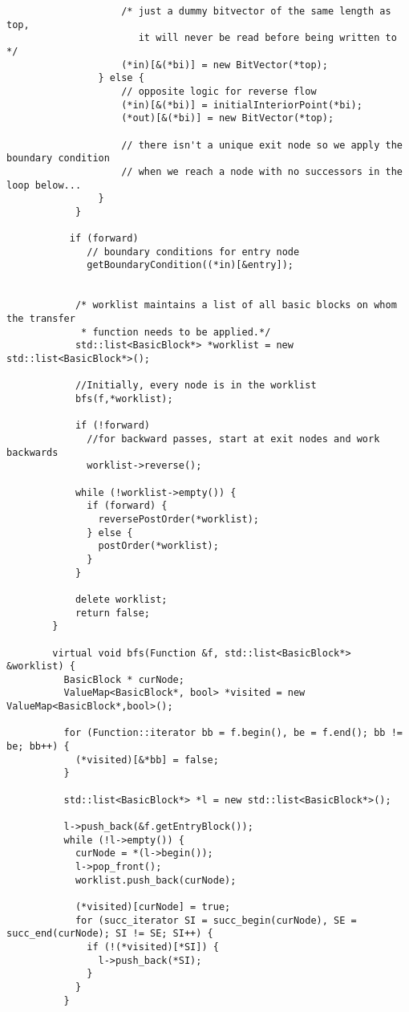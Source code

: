 \documentclass[12pt]{article}
\begin{document}
\begin{verbatim}
                	/* just a dummy bitvector of the same length as top,
                	   it will never be read before being written to */
                	(*in)[&(*bi)] = new BitVector(*top);
                } else {
                	// opposite logic for reverse flow
                	(*in)[&(*bi)] = initialInteriorPoint(*bi);
                	(*out)[&(*bi)] = new BitVector(*top);
                	
                	// there isn't a unique exit node so we apply the boundary condition
                	// when we reach a node with no successors in the loop below...
                }
            }

           if (forward)            
              // boundary conditions for entry node
              getBoundaryCondition((*in)[&entry]);         

            
            /* worklist maintains a list of all basic blocks on whom the transfer 
             * function needs to be applied.*/
            std::list<BasicBlock*> *worklist = new std::list<BasicBlock*>();

            //Initially, every node is in the worklist
            bfs(f,*worklist); 

            if (!forward)
              //for backward passes, start at exit nodes and work backwards
              worklist->reverse(); 

            while (!worklist->empty()) {
              if (forward) {
                reversePostOrder(*worklist);
              } else {
                postOrder(*worklist);
              }
            }

            delete worklist;
            return false;
        }

        virtual void bfs(Function &f, std::list<BasicBlock*> &worklist) {
          BasicBlock * curNode;
          ValueMap<BasicBlock*, bool> *visited = new ValueMap<BasicBlock*,bool>();

          for (Function::iterator bb = f.begin(), be = f.end(); bb != be; bb++) {
            (*visited)[&*bb] = false;
          }

          std::list<BasicBlock*> *l = new std::list<BasicBlock*>();

          l->push_back(&f.getEntryBlock());
          while (!l->empty()) {
            curNode = *(l->begin());
            l->pop_front();
            worklist.push_back(curNode);

            (*visited)[curNode] = true;
            for (succ_iterator SI = succ_begin(curNode), SE = succ_end(curNode); SI != SE; SI++) {
              if (!(*visited)[*SI]) {
                l->push_back(*SI);
              }
            }
          }


\end{verbatim}
\end{document}
